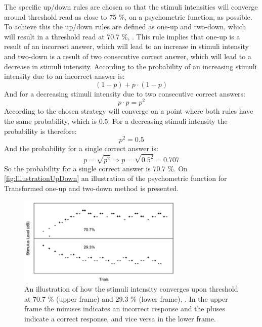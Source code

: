 The specific up/down rules are chosen so that the stimuli intensities will converge around threshold read as close to 75 \%, on a psychometric function, as possible. To achieve this the up/down rules are defined as one-up and two-down, which will result in a threshold read at 70.7 \%, \parencite[p. 22]{PDF:Psychoacoustic}. This rule implies that one-up is a result of an incorrect answer, which will lead to an increase in stimuli intensity and two-down is a result of two consecutive correct answer, which will lead to a decrease in stimuli intensity. According to \textcite[p. 293]{PDF:Hearing} the probability of an increasing stimuli intensity due to an incorrect answer is: 
%
\begin{equation}
	(1-p)+p\cdot(1-p)
\end{equation}  
%
And for a decreasing stimuli intensity due to two consecutive correct answers: 
%
\begin{equation}
	p\cdot p = p^2
\end{equation}    
%       
According to \textcite[p. 293]{PDF:Hearing} the chosen strategy will converge on a point where both rules have the same probability, which is 0.5. For a decreasing stimuli intensity the probability is therefore:
%
\begin{equation}
	p^2=0.5
\end{equation}  
%
And the probability for a single correct answer is: 
%
\begin{equation}
	p = \sqrt{p^2} \Rightarrow p = \sqrt{0.5^2} = 0.707
\end{equation}
%
So the probability for a single correct answer is 70.7 \%. On \autoref{fig:IllustrationUpDown} an illustration of the psychometric function for Transformed one-up and two-down method is presented. 
%
\begin{figure}[H]
	\centering
	\includegraphics[resolution=300,width=0.7\textwidth]{Figure/IllustrationOfUpDown}
	\caption{An illustration of how the stimuli intensity converges upon threshold at 70.7 \% (upper frame) and 29.3 \% (lower frame), \parencite[p. 294]{PDF:Hearing}. In the upper frame the minuses indicates an incorrect response and the pluses indicate a correct response, and vice versa in the lower frame.}
	\label{fig:IllustrationUpDown}
\end{figure}

